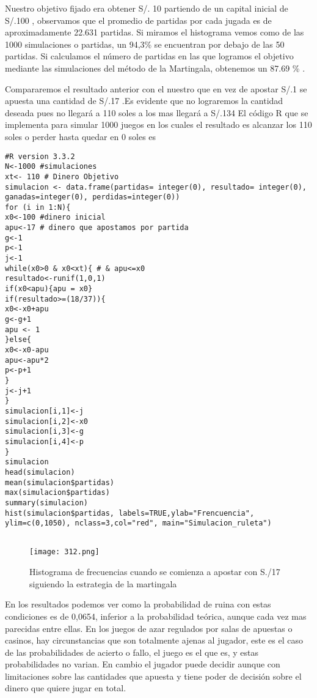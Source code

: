 \documentclass[letterpaper, 10 pt, conference]{ieeeconf}  %
\begin{document}
Nuestro objetivo fijado era obtener S/. 10 partiendo de un capital inicial de S/.100 , observamos
que el promedio de partidas por cada jugada es de aproximadamente 22.631 partidas. Si miramos el histograma vemos como de las 1000 simulaciones o partidas, un 94,3\% se encuentran por
debajo de las 50 partidas.
Si calculamos el número de partidas en las que logramos el objetivo mediante las simulaciones
del método de la Martingala, obtenemos un 87.69 \% .

\newpage
Compararemos el resultado anterior con el nuestro  que en vez de apostar S/.1  se apuesta una cantidad de S/.17 .Es evidente que no lograremos
la cantidad deseada pues no llegará a 110 soles a los mas llegará a S/.134
El código R que se implementa para simular 1000 juegos en los cuales el resultado es alcanzar los 110 soles o perder hasta quedar en 0 soles es 
\newpage
\begin{verbatim}
#R version 3.3.2 
N<-1000 #simulaciones
xt<- 110 # Dinero Objetivo
simulacion <- data.frame(partidas= integer(0), resultado= integer(0), ganadas=integer(0), perdidas=integer(0))
for (i in 1:N){
x0<-100 #dinero inicial
apu<-17 # dinero que apostamos por partida
g<-1
p<-1
j<-1
while(x0>0 & x0<xt){ # & apu<=x0
resultado<-runif(1,0,1)
if(x0<apu){apu = x0}
if(resultado>=(18/37)){
x0<-x0+apu
g<-g+1
apu <- 1
}else{
x0<-x0-apu
apu<-apu*2
p<-p+1
}
j<-j+1
}
simulacion[i,1]<-j
simulacion[i,2]<-x0
simulacion[i,3]<-g
simulacion[i,4]<-p
}
simulacion
head(simulacion)
mean(simulacion$partidas)
max(simulacion$partidas)
summary(simulacion)
hist(simulacion$partidas, labels=TRUE,ylab="Frencuencia", ylim=c(0,1050), nclass=3,col="red", main="Simulacion_ruleta")


\end{verbatim}
\begin{figure}
    \centering
    \texttt{[image: 312.png]}
    \caption{Histograma de frecuencias cuando se comienza a apostar con S./17 siguiendo la estrategia de la martingala}
    \label{fig:my_label}
\end{figure}
En los resultados podemos ver como la probabilidad de ruina con estas condiciones es de
0,0654, inferior a la probabilidad teórica, aunque cada vez mas parecidas entre ellas.
En los juegos de azar regulados por salas de apuestas o casinos, hay circunstancias que son
totalmente ajenas al jugador, este es el caso de las probabilidades de acierto o fallo, el juego
es el que es, y estas probabilidades no varian. En cambio el jugador puede decidir aunque con
limitaciones sobre las cantidades que apuesta y tiene poder de decisión sobre el dinero que
quiere jugar en total.
\newpage
\end{document}
